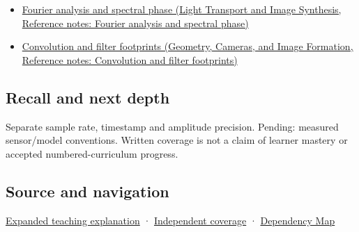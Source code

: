 \hypertarget{appendix-1077ea8fc737-used-by}{}

\begin{itemize}
\tightlist
\item
  \href{../04-Light-Transport-and-Image-Synthesis/main.pdf\#nameddest=appendix-b60686ba06a1}{Fourier analysis and spectral phase (Light Transport and Image Synthesis, Reference notes: Fourier analysis and spectral phase)}
\item
  \href{../03-Geometry-Cameras-and-Image-Formation/main.pdf\#nameddest=appendix-d5b3c692d9f0}{Convolution and filter footprints (Geometry, Cameras, and Image Formation, Reference notes: Convolution and filter footprints)}
\end{itemize}

\subsection{Recall and next depth}\label{appendix-1077ea8fc737-recall-and-next-depth}

\hypertarget{appendix-1077ea8fc737-recall-and-next-depth}{}

Separate sample rate, timestamp and amplitude precision. Pending: measured sensor/model conventions. Written coverage is not a claim of learner mastery or accepted numbered-curriculum progress.

\subsection{Source and navigation}\label{appendix-1077ea8fc737-source-and-navigation}

\hypertarget{appendix-1077ea8fc737-source-and-navigation}{}

\hyperref[04-visual-computing-ii-ch042-sampling-is-a-question-of-what-remains-distinguishable]{Expanded teaching explanation} · \hyperref[appendix-fd090d982a15-xr01---independent-seeing-and-representation-source]{Independent coverage} · \hyperref[appendix-4ad47bdd269a]{Dependency Map}
